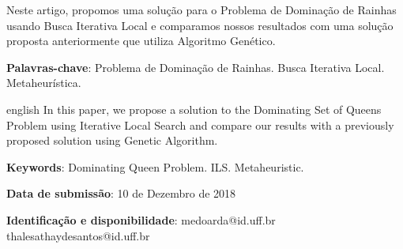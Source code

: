 \documentclass[
	article,			%
	11pt,				%
	oneside,			%
	a4paper,			%
	english,			%
	brazil,				%
	sumario=tradicional
	]{abntex2}
\begin{document}

\frenchspacing 


%
%

\maketitle





\begin{resumoumacoluna}
Neste artigo, propomos uma solução para o Problema de Dominação de Rainhas usando Busca Iterativa Local e comparamos nossos resultados com uma solução proposta anteriormente que utiliza Algoritmo Genético.
 
 \vspace{\onelineskip}
 
 \noindent
 \textbf{Palavras-chave}: Problema de Dominação de Rainhas. Busca Iterativa Local. Metaheurística.
\end{resumoumacoluna}


\renewcommand{\resumoname}{Abstract}
\begin{resumoumacoluna}
 \begin{otherlanguage*}{english}
  In this paper, we propose a solution to the Dominating Set of Queens Problem
  using Iterative Local Search and compare our results with a previously proposed 
  solution using Genetic Algorithm.

   \vspace{\onelineskip}
 
   \noindent
   \textbf{Keywords}: Dominating Queen Problem. ILS. Metaheuristic.
 \end{otherlanguage*}  
\end{resumoumacoluna}


\begin{center}\smaller
\textbf{Data de submissão}: 10 de Dezembro de 2018

\textbf{Identificação e disponibilidade}: medoarda@id.uff.br thalesathaydesantos@id.uff.br
\end{center}
\end{document}
